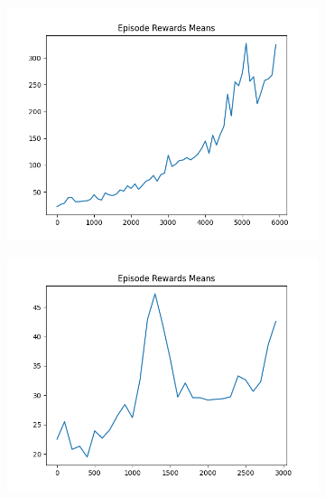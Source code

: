 \begin{figure}[H]
    \centering
    \begin{subfigure}{.47\linewidth}
        \centering
        \includegraphics[width=\textwidth]{pole/2024-06-14_18-50-42_dqn_cartpole_episode_rewards_means.png}
    \end{subfigure}
    \begin{subfigure}{.47\linewidth}
        \centering
        \includegraphics[width=\textwidth]{pole/2024-06-13_19-16-11_dqn_cartpole_episode_rewards_means.png}
    \end{subfigure}
    \begin{subfigure}{.47\linewidth}
        \centering

\end{subfigure}
\end{figure}
